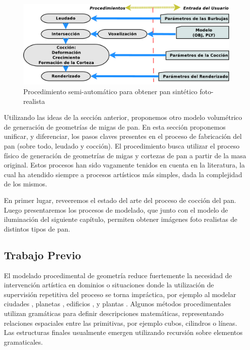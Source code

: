 \documentclass[spanish,a4paper,openright,11pt]{book}
\begin{document}
\begin{figure}
\includegraphics[width=15cm]{figures/pipeline}
\caption{Procedimiento semi-automático para obtener pan sintético foto-realista}
\label{FigPipeline}
\end{figure}

Utilizando las ideas de la sección anterior, proponemos otro modelo volumétrico de generación de geometrías de migas de pan.
En esta sección proponemos unificar, y diferenciar, los pasos claves presentes en el proceso de fabricación del pan (sobre todo, leudado y cocción).
El procedimiento busca utilizar el proceso físico de generación de geometrías de migas y cortezas de pan a partir de la masa original.
Estos procesos han sido vagamente tenidos en cuenta en la literatura, la cual ha atendido siempre a procesos artísticos más simples, dada la complejidad de los mismos.

En primer lugar, reveeremos el estado del arte del proceso de cocción del pan.
Luego presentaremos los procesos de modelado, que junto con el modelo de iluminación del siguiente capítulo, permiten obtener imágenes foto realistas de distintos tipos de pan.

\subsection{Trabajo Previo}
El modelado procedimental de geometría reduce fuertemente la necesidad de intervención artística en dominios o situaciones donde la utilización de supervisión repetitiva del proceso se torna impráctica, por ejemplo al modelar ciudades \cite{Parish2001}, planetas \cite{Ebert2002}, edificios \cite{Muller2006}, y plantas \cite{Prusinkiewicz1990}. 
Algunos métodos procedimentales utilizan gramáticas para definir descripciones matemáticas, representando relaciones espaciales entre las primitivas, por ejemplo cubos, cilindros o líneas.
Las estructuras finales usualmente emergen utilizando recursión sobre elementos gramaticales.
\end{document}
